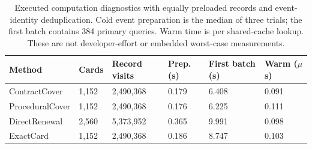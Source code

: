 \begin{table}[!htbp]\centering\small
\caption{Executed computation diagnostics with equally preloaded records and event-identity deduplication. Cold event preparation is the median of three trials; the first batch contains 384 primary queries. Warm time is per shared-cache lookup. These are not developer-effort or embedded worst-case measurements.}\label{tab:r9-cost}
\begin{tabular}{@{}llllll@{}}\toprule
Method & Cards & Record visits & Prep. (s) & First batch (s) & Warm ($\mu$s)\\\midrule
ContractCover & 1,152 & 2,490,368 & 0.179 & 6.408 & 0.091\\
ProceduralCover & 1,152 & 2,490,368 & 0.176 & 6.225 & 0.111\\
DirectRenewal & 2,560 & 5,373,952 & 0.365 & 9.991 & 0.098\\
ExactCard & 1,152 & 2,490,368 & 0.186 & 8.747 & 0.103\\
\bottomrule\end{tabular}\end{table}
